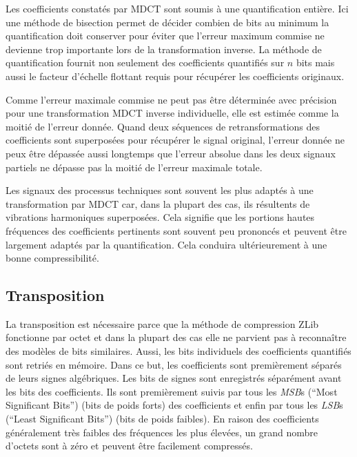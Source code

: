 \documentclass[a4paper,12pt,BCOR6mm,bibtotoc,idxtotoc]{scrbook}
\begin{document}
Les coefficients constat\'es par MDCT sont soumis \`a une
quantification enti\`ere. Ici une m\'ethode de bisection permet de
d\'ecider combien de bits au minimum la quantification doit conserver
pour \'eviter que l'erreur maximum commise ne devienne trop importante
lors de la transformation inverse. La m\'ethode de quantification
fournit non seulement des coefficients quantifi\'es sur $n$ bits mais
aussi le facteur d'\'echelle flottant requis pour r\'ecup\'erer les
coefficients originaux.

Comme l'erreur maximale commise ne peut pas \^etre d\'etermin\'ee avec
pr\'ecision pour une transformation MDCT inverse individuelle, elle
est estim\'ee comme la moiti\'e de l'erreur donn\'ee.  Quand deux
s\'equences de retransformations des coefficients sont superpos\'ees
pour r\'ecup\'erer le signal original, l'erreur donn\'ee ne peux
\^etre d\'epass\'ee aussi longtemps que l'erreur absolue dans les deux
signaux partiels ne d\'epasse pas la moiti\'e de l'erreur maximale
totale.

Les signaux des processus techniques sont souvent les plus adapt\'es
\`a une transformation par MDCT car, dans la plupart des cas, ils
r\'esultents de vibrations harmoniques superpos\'ees.  Cela signifie
que les portions hautes fr\'equences des coefficients pertinents sont
souvent peu prononc\'es et peuvent \^etre largement adapt\'es par la
quantification. Cela conduira ult\'erieurement \`a une bonne
compressibilit\'e.

\subsection{Transposition}
\label{sec:comp_mdct_trans}

La transposition est n\'ecessaire parce que la m\'ethode de
compression ZLib fonctionne par octet et dans la plupart des cas elle
ne parvient pas \`a reconna\^itre des mod\`eles de bits similaires.
Aussi, les bits individuels des coefficients quantifi\'es sont
retri\'es en m\'emoire.  Dans ce but, les coefficients sont
premi\`erement s\'epar\'es de leurs signes alg\'ebriques.  Les bits de
signes sont enregistr\'es s\'epar\'ement avant les bits des
coefficients.  Ils sont premi\`erement suivis par tous les
\textit{MSB}s (``Most Significant Bits'') (bits de poids forts) des
coefficients et enfin par tous les \textit{LSB}s (``Least Significant
Bits'') (bits de poids faibles).  En raison des coefficients
g\'en\'eralement tr\`es faibles des fr\'equences les plus \'elev\'ees,
un grand nombre d'octets sont \`a z\'ero et peuvent \^etre facilement
compress\'es.
\end{document}
